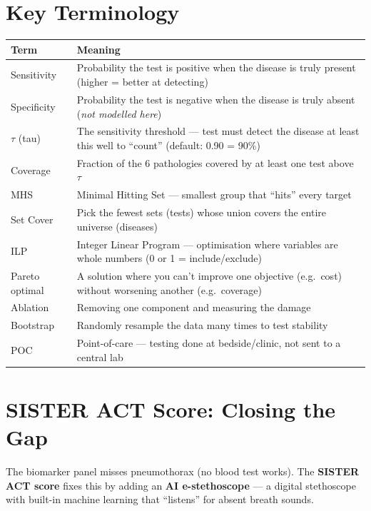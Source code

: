 \documentclass[11pt,a4paper]{article}
\begin{document}
\section{Key Terminology}

\begin{table}[h]
\centering\small
\renewcommand{\arraystretch}{1.25}
\begin{tabular}{@{}p{3.2cm}p{11cm}@{}}
\toprule
\textbf{Term} & \textbf{Meaning} \\
\midrule
Sensitivity & Probability the test is positive when the disease is truly present (higher = better at detecting) \\
Specificity & Probability the test is negative when the disease is truly absent (\emph{not modelled here}) \\
$\tau$ (tau) & The sensitivity threshold --- test must detect the disease at least this well to ``count'' (default: 0.90 = 90\%) \\
Coverage & Fraction of the 6 pathologies covered by at least one test above $\tau$ \\
MHS & Minimal Hitting Set --- smallest group that ``hits'' every target \\
Set Cover & Pick the fewest sets (tests) whose union covers the entire universe (diseases) \\
ILP & Integer Linear Program --- optimisation where variables are whole numbers (0 or 1 = include/exclude) \\
Pareto optimal & A solution where you can't improve one objective (e.g.\ cost) without worsening another (e.g.\ coverage) \\
Ablation & Removing one component and measuring the damage \\
Bootstrap & Randomly resample the data many times to test stability \\
POC & Point-of-care --- testing done at bedside/clinic, not sent to a central lab \\
\bottomrule
\end{tabular}
\end{table}


\section{SISTER ACT Score: Closing the Gap}

The biomarker panel misses pneumothorax (no blood test works). The
\textbf{SISTER ACT score} fixes this by adding an \textbf{AI e-stethoscope}
--- a digital stethoscope with built-in machine learning that ``listens''
for absent breath sounds.
\end{document}
